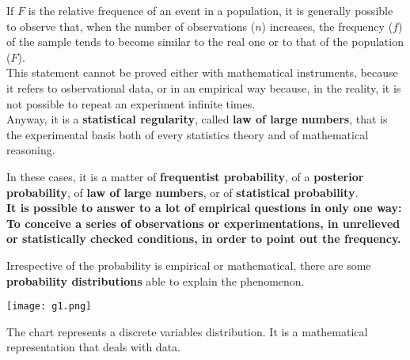 \begin{frame}
  \vspace*{.25cm}
  If {\boldmath $ F $} is the relative frequence of an event in a population, it is generally possible to observe that, when the number of observations ({\boldmath $ n $}) increases, the  frequency ({\boldmath $ f $}) of the sample tends to become similar to the real one or to that of the population ({\boldmath $ F $}).\\
  \vspace*{.25cm}
  This statement cannot be proved either with mathematical instruments, because it refers to osbervational data, or in an empirical way because, in the reality, it is not possible to repeat an experiment infinite times.\\
  \vspace*{.25cm}
  Anyway, it is a \textbf{statistical regularity}, called \textbf{law of large numbers}, that is the experimental basis both of every statistics theory and of mathematical reasoning.
\end{frame}

\begin{frame}
  \vspace*{.25cm}
  In these cases, it is a matter of \textbf{frequentist probability}, of a \textbf{posterior probability}, of \textbf{law of large numbers}, or of \textbf{statistical probability}.\\
  \vspace*{.4cm}
  \textbf{It is possible to answer to a lot of empirical questions in only one way:} \\
  \vspace*{.2cm}
  \textbf{To conceive a series of observations or experimentations, in unrelieved or statistically checked conditions, in order to point out the frequency.}
\end{frame}




\begin{frame}
  Irrespective of the probability is empirical or mathematical, there are some \textbf{probability distributions} able to explain the phenomenon.
  \begin{center}
    \texttt{[image: g1.png]}
  \end{center}
  The chart represents a discrete variables distribution. It is a mathematical representation that deals with data. 
\end{frame}

